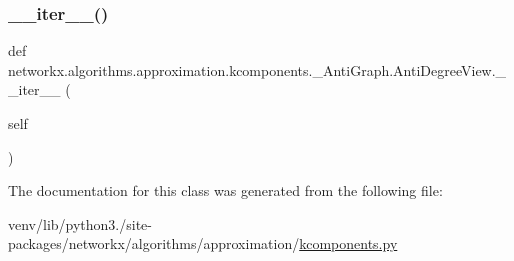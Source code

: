 \subsubsection{\texorpdfstring{\+\_\+\+\_\+iter\+\_\+\+\_\+()}{\_\_iter\_\_()}}
{\footnotesize\ttfamily def networkx.\+algorithms.\+approximation.\+kcomponents.\+\_\+\+Anti\+Graph.\+Anti\+Degree\+View.\+\_\+\+\_\+iter\+\_\+\+\_\+ (\begin{DoxyParamCaption}\item[{}]{self }\end{DoxyParamCaption})}



The documentation for this class was generated from the following file\+:\begin{DoxyCompactItemize}
\item 
venv/lib/python3./site-\/packages/networkx/algorithms/approximation/\hyperlink{approximation_2kcomponents_8py}{kcomponents.\+py}\end{DoxyCompactItemize}
